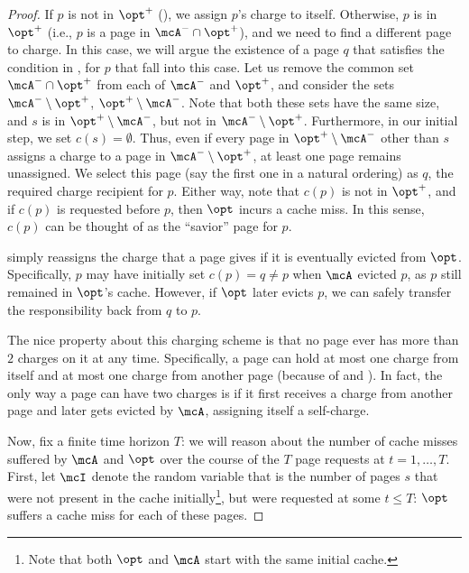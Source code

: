 \documentclass[11pt]{article}
\begin{document}
\begin{proof}
    If $p$ is not in $\opt^+$ (), we assign $p$'s charge to itself. Otherwise, $p$ is in $\opt^+$ (i.e., $p$ is a page in $\mcA^- \cap \opt^+$), and we need to find a different page to charge. In this case, we will argue the existence of a page $q$ that satisfies the condition in , for $p$ that fall into this case. Let us remove the common set $\mcA^- \cap \opt^+$ from each of $\mcA^-$ and $\opt^+$, and consider the sets $\mcA^- \setminus \opt^+$, $\opt^+ \setminus \mcA^-$. Note that both these sets have the same size, and $s$ is in $\opt^+ \setminus \mcA^-$, but not in $\mcA^- \setminus \opt^+$. Furthermore, in our initial step, we set $c(s)=\emptyset$. Thus, even if every page in $\opt^+ \setminus \mcA^-$ other than $s$ assigns a charge to a page in $\mcA^- \setminus \opt^+$, at least one page remains unassigned.
    We select this page (say the first one in a natural ordering) as $q$, the required charge recipient for $p$. Either way, note that $c(p)$ is not in $\opt^+$, and if $c(p)$ is requested before $p$, then $\opt$ incurs a cache miss. In this sense, $c(p)$ can be thought of as the “savior” page for $p$. 

     simply reassigns the charge that a page gives if it is eventually evicted from $\opt$. 
    Specifically, $p$ may have initially set $c(p) = q \neq p$ when $\mcA$ evicted $p$, as $p$ still remained in $\opt$'s cache. However, if $\opt$ later evicts $p$, we can safely transfer the responsibility back from $q$ to $p$.
    

    The nice property about this charging scheme is that no page ever has more than $2$ charges on it at any time. Specifically, a page can hold at most one charge from itself and at most one charge from another page (because of  and ). 
    In fact, the only way a page can have two charges is if it first receives a charge from another page and later gets evicted by $\mcA$, assigning itself a self-charge.

    Now, fix a finite time horizon $T$: we will reason about the number of cache misses suffered by $\mcA$ and $\opt$ over the course of the $T$ page requests at $t=1,\dots,T$.
    First, let $\mcI$ denote the random variable that is the number of pages $s$ that were not present in the cache initially\footnote{Note that both $\opt$ and $\mcA$ start with the same initial cache.}, but were requested at some $t \le T$: $\opt$ suffers a cache miss for each of these pages.


\end{proof}
\end{document}
